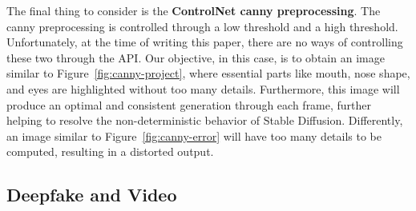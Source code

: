 \documentclass[preprint]{elsarticle}
\begin{document}
The final thing to consider is the \textbf{ControlNet canny preprocessing}. 
The canny preprocessing is controlled through a low threshold and a high threshold. 
Unfortunately, at the time of writing this paper, there are no ways of 
controlling these two through the API.
Our objective, in this case, is to obtain an image similar to Figure~\ref{fig:canny-project}, 
where essential parts like mouth, nose shape, and eyes are highlighted without too many details. 
Furthermore, this image will produce an optimal and consistent generation through each frame, 
further helping to resolve the non-deterministic behavior of Stable Diffusion.
Differently,  an image similar to Figure~\ref{fig:canny-error} will have too many details to be computed, 
resulting in a distorted output.



\subsection{Deepfake and Video}
\end{document}
